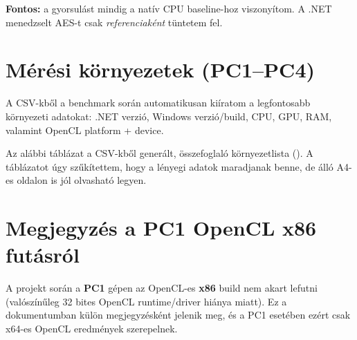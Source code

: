 \textbf{Fontos:} a gyorsulást mindig a natív CPU baseline-hoz viszonyítom.
A .NET menedzselt AES-t csak \emph{referenciaként} tüntetem fel.

\section{Mérési környezetek (PC1--PC4)}

A CSV-kből a benchmark során automatikusan kiíratom a legfontosabb környezeti adatokat:
.NET verzió, Windows verzió/build, CPU, GPU, RAM, valamint OpenCL platform + device.

Az alábbi táblázat a CSV-kből generált, összefoglaló környezetlista ().
A táblázatot úgy szűkítettem, hogy a lényegi adatok maradjanak benne, de álló A4-es oldalon is jól olvasható legyen.

\begin{table}[h!]
  \centering
  \caption{A mérések fő környezeti jellemzői a CSV metaadatok alapján.}\label{tab:machines}
\end{table}

\section{Megjegyzés a PC1 OpenCL x86 futásról}

A projekt során a \textbf{PC1} gépen az OpenCL-es \textbf{x86} build nem akart lefutni
(valószínűleg 32 bites OpenCL runtime/driver hiánya miatt).
Ez a dokumentumban külön megjegyzésként jelenik meg, és a PC1 esetében ezért csak x64-es OpenCL eredmények szerepelnek.

\cleardoublepage
